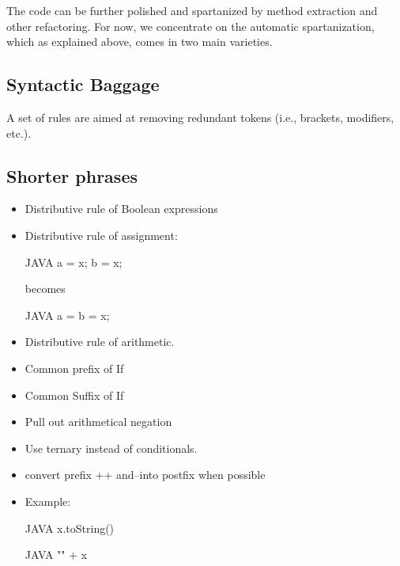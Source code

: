 The code can be
further polished and spartanized by method extraction and other refactoring.
For now, we concentrate on the automatic spartanization, which as explained
above, comes in
two main varieties.\subsection{Syntactic Baggage}
A set of rules are aimed at removing redundant tokens (i.e., brackets,
modifiers, etc.).
\subsection{Shorter phrases}
\begin{itemize}
  \item Distributive rule of Boolean expressions
  \item Distributive rule of assignment:
        \begin{code}{JAVA}
a = x;
b = x;
  \end{code}
  becomes
  \begin{code}{JAVA}
a = b = x;
  \end{code}
  \item Distributive rule of arithmetic.
  \item Common prefix of If
  \item Common Suffix of If
  \item Pull out arithmetical negation
  \item Use ternary instead of conditionals.
  \item convert prefix ++ and--into postfix when possible
  \item Example:
        \begin{code}{JAVA}
x.toString()
  \end{code}
  \begin{code}{JAVA}
"" + x
  \end{code}
\end{itemize}


